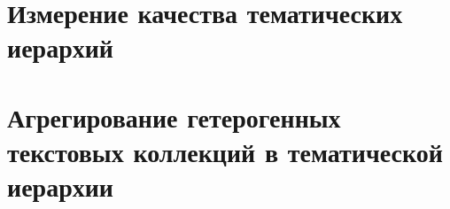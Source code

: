 \chapter{Измерение качества тематических иерархий}

\chapter{Агрегирование гетерогенных текстовых коллекций в тематической иерархии}

